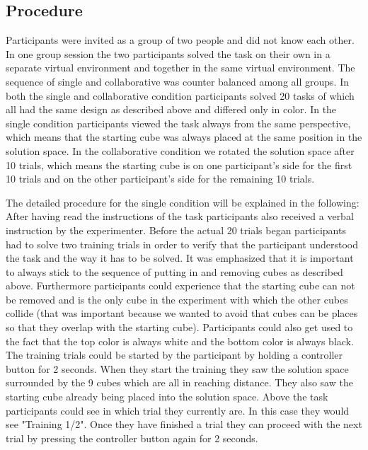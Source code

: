 \documentclass{article}
\begin{document}
\subsection{Procedure}
Participants were invited as a group of two people and did not know each other. In one group session the two participants solved the task on their own in a separate virtual environment and together in the same virtual environment. The sequence of single and collaborative was counter balanced among all groups. In both the single and collaborative condition participants solved 20 tasks of which all had the same design as described above and differed only in color. In the single condition participants viewed the task always from the same perspective, which means that the starting cube was always placed at the same position in the solution space.
In the collaborative condition we rotated the solution space after 10 trials, which means the starting cube is on one participant's side for the first 10 trials and on the other participant's side for the remaining 10 trials. 

The detailed procedure for the single condition will be explained in the following:
After having read the instructions of the task participants also received a verbal instruction by the experimenter. Before the actual 20 trials began participants had to solve two training trials in order to verify that the participant understood the task and the way it has to be solved. It was emphasized that it is important to always stick to the sequence of putting in and removing cubes as described above. Furthermore participants could experience that the starting cube can not be removed and is the only cube in the experiment with which the other cubes collide (that was important because we wanted to avoid that cubes can be places so that they overlap with the starting cube). Participants could also get used to the fact that the top color is always white and the bottom color is always black. The training trials could be started by the participant by holding a controller button for 2 seconds. When they start the training they saw the solution space surrounded by the 9 cubes which are all in reaching distance. They also saw the starting cube already being placed into the solution space. Above the task participants could see in which trial they currently are. In this case they would see "Training 1/2". Once they have finished a trial they can proceed with the next trial by pressing the controller button again for 2 seconds. 
\end{document}
